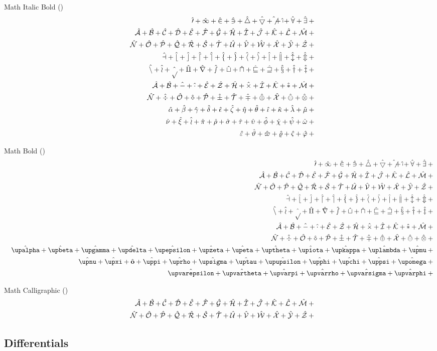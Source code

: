 	Math Italic Bold (\texttt{\string\bm})
	\def\test#1{\hat{\bm{#1}}+{}}%
	\begin{eqnarray*}
	  && {\testnums}\\
	  && {\testupperi}\\
	  && {\testupperii}\\
	  && {\testloweri}\\
	  && {\testlowerii}\\
	  && {\testupgreeki}\\
	  && {\testupgreekii}\\
	  && {\testlowgreeki}\\
	  && {\testlowgreekii}\\
	  && {\testlowgreekiii}
	\end{eqnarray*}%

	Math Bold (\texttt{\string\mathbf})
	\def\test#1{\hat{\mathbf{#1}}+{}}%
	\begin{eqnarray*}
	  && {\testnums}\\
	  && {\testupperi}\\
	  && {\testupperii}\\
	  && {\testloweri}\\
	  && {\testlowerii}\\
	  && {\testupgreeki}\\
	  && {\testupgreekii}\\
	  && {\def\test#1{\hat{\bm{\mathbf{#1}}}+{}}\testlowgreekupi}\\
	  && {\def\test#1{\hat{\bm{\mathbf{#1}}}+{}}\testlowgreekupii}\\
	  && {\def\test#1{\hat{\bm{\mathbf{#1}}}+{}}\testlowgreekupiii}
	\end{eqnarray*}

	Math Calligraphic (\texttt{\string\mathcal})
	\def\test#1{\hat{\mathcal{#1}}+{}}%
	\begin{eqnarray*}
	  && {\testupperi}\\
	  && {\testupperii}
	\end{eqnarray*}%

	\subsection{Differentials \showfamily}

